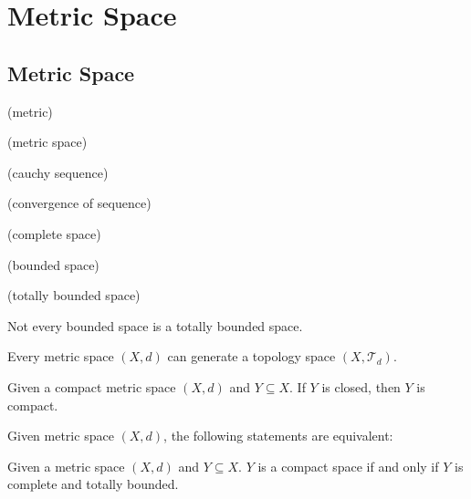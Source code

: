 \chapter{Metric Space}

\section{Metric Space}

\begin{definition}
(metric)
\end{definition}

\begin{definition}
(metric space)
\end{definition}

\begin{definition}
(cauchy sequence)
\end{definition}

\begin{definition}
(convergence of sequence)
\end{definition}

\begin{definition}
(complete space)
\end{definition}

\begin{definition}
(bounded space)
\end{definition}

\begin{definition}
(totally bounded space)
\end{definition}

\begin{warning}
Not every bounded space is a totally bounded space. 
\end{warning}

\begin{theorem}
Every metric space $(X, d)$ can generate a topology space $(X, \mathcal{T}_{d})$. 
\end{theorem}

\begin{theorem}
Given a compact metric space $(X, d)$ and $Y \subseteq X$. If $Y$ is closed, then $Y$ is compact. 
\end{theorem}

\begin{theorem}
Given metric space $(X, d)$, the following statements are equivalent: 
\end{theorem}

\begin{theorem}
Given a metric space $(X, d)$ and $Y \subseteq X$. $Y$ is a compact space if and only if $Y$ is complete and totally bounded. 
\end{theorem}

